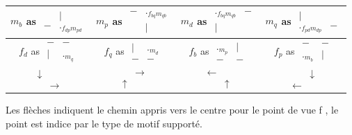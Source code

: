 \documentclass{article}
\begin{document}
\begin{tabular} {|c|c|c|c|}
\hline
$m_b$ as $\begin{matrix} &|\\ - &._{f_{dp}m_{pd}}\end{matrix}$ & 
 $m_p$ as $\begin{matrix} - &._{f_{bq}m_{qb}}\\&| \end{matrix}$& 
 $m_d$ as $\begin{matrix}  ._{f_{bq}m_{qb}} &-\\ | & \end{matrix}$ & 
 $m_q$ as $\begin{matrix} | & \\ ._{f_{pd}m_{dp}}&- \end{matrix}$\\ 
\hline
$f_d$ as $\begin{matrix} -&-\\ |& ._{m_{q}}\end{matrix}$ &
$f_q$ as $\begin{matrix} |& ._{m_{d}} \\ -&- \end{matrix}$ &
 $f_b$ as $\begin{matrix}  ._{m_{p}} & | \\ -&-  \end{matrix}$ &
 $f_p$ as $\begin{matrix} -&-\\  ._{m_{b}}&|\end{matrix}$  \\ 
\hline
$\begin{matrix} \downarrow &\\ &\rightarrow \end{matrix}$&
$\begin{matrix}  &\rightarrow \\\uparrow& \end{matrix}$&
$\begin{matrix} \leftarrow &\\ &\uparrow \end{matrix}$&
$\begin{matrix} &\downarrow \\ \leftarrow & \end{matrix}$\\
\hline
\end{tabular}
Les flèches indiquent le chemin appris vers le centre pour le point de vue f  , le point est indice par le type de motif supporté.
\end{document}
